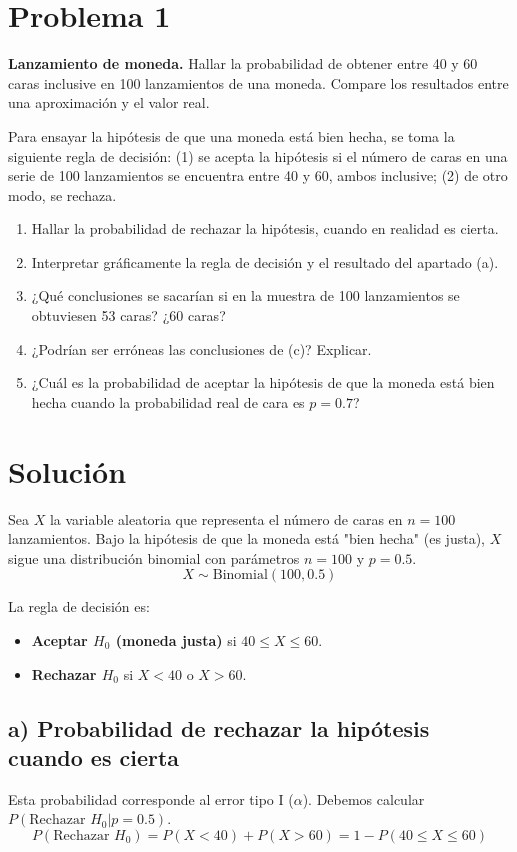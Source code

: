 \documentclass[12pt]{article}
\begin{document}
\section*{Problema 1}
\textbf{Lanzamiento de moneda.} Hallar la probabilidad de obtener entre 40 y 60 caras inclusive en 100 lanzamientos de una moneda. Compare los resultados entre una aproximación y el valor real.

Para ensayar la hipótesis de que una moneda está bien hecha, se toma la siguiente regla de decisión: (1) se acepta la hipótesis si el número de caras en una serie de 100 lanzamientos se encuentra entre 40 y 60, ambos inclusive; (2) de otro modo, se rechaza.
\begin{enumerate}
\item[a)] Hallar la probabilidad de rechazar la hipótesis, cuando en realidad es cierta.
\item[b)] Interpretar gráficamente la regla de decisión y el resultado del apartado (a).
\item[c)] ¿Qué conclusiones se sacarían si en la muestra de 100 lanzamientos se obtuviesen 53 caras? ¿60 caras?
\item[d)] ¿Podrían ser erróneas las conclusiones de (c)? Explicar.
\item[e)] ¿Cuál es la probabilidad de aceptar la hipótesis de que la moneda está bien hecha cuando la probabilidad real de cara es $p = 0.7$?
\end{enumerate}

\section*{Solución}
Sea $X$ la variable aleatoria que representa el número de caras en $n=100$ lanzamientos. Bajo la hipótesis de que la moneda está "bien hecha" (es justa), $X$ sigue una distribución binomial con parámetros $n=100$ y $p=0.5$.
$$ X \sim \text{Binomial}(100, 0.5) $$

La regla de decisión es:
\begin{itemize}
    \item \textbf{Aceptar $H_0$ (moneda justa)} si $40 \le X \le 60$.
    \item \textbf{Rechazar $H_0$} si $X < 40$ o $X > 60$.
\end{itemize}

\subsection*{a) Probabilidad de rechazar la hipótesis cuando es cierta}
Esta probabilidad corresponde al error tipo I ($\alpha$). Debemos calcular $P(\text{Rechazar } H_0 | p=0.5)$.
$$ P(\text{Rechazar } H_0) = P(X < 40) + P(X > 60) = 1 - P(40 \le X \le 60) $$
\end{document}
